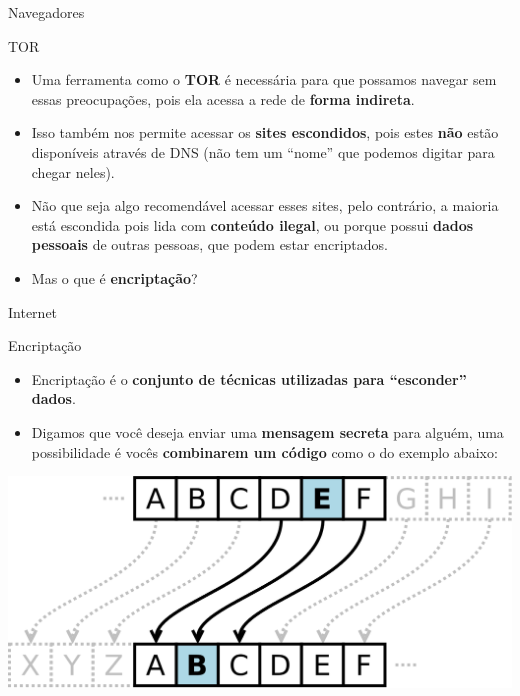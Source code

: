 \begin{frame}{Navegadores}
	\begin{block}{TOR}
		\begin{itemize}
			\item Uma ferramenta como o \textbf{TOR} é necessária para que possamos navegar sem essas preocupações, pois ela acessa a rede de \textbf{forma indireta}.
			\item Isso também nos permite acessar os \textbf{sites escondidos}, pois estes \textbf{não} estão disponíveis através de DNS (não tem um ``nome'' que podemos digitar para chegar neles).
			\item Não que seja algo recomendável acessar esses sites, pelo contrário, a maioria está escondida pois lida com \textbf{conteúdo ilegal}, ou porque possui \textbf{dados pessoais} de outras pessoas, que podem estar encriptados.
			\item Mas o que é \textbf{encriptação}?
		\end{itemize}
	\end{block}

\end{frame}


\begin{frame}{Internet}
	\begin{block}{Encriptação}
		\begin{itemize}
			\item Encriptação é o \textbf{conjunto de técnicas utilizadas para ``esconder'' dados}.
			\item Digamos que você deseja enviar uma \textbf{mensagem secreta} para alguém, uma possibilidade é vocês \textbf{combinarem um código} como o do exemplo abaixo:
		\end{itemize}
	\end{block}

	\medskip

	\centering
	\includegraphics[width=0.7\linewidth]{Figuras/Ch03/fig11}
\end{frame}


